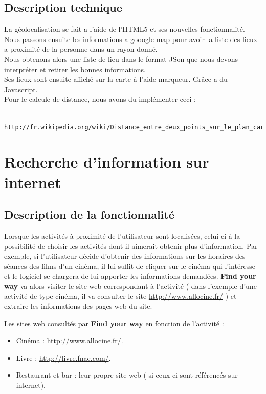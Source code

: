 \documentclass[10pt,a4paper]{report}
\begin{document}
\subsection{Description technique}
\begin{flushleft}
La géolocalisation se fait a l'aide de l'HTML5 et ses nouvelles fonctionnalité. Nous passons ensuite les informations a gooogle map pour avoir la liste des lieux a proximité de la personne dans un rayon donné. \\
Nous obtenons alors une liste de lieu dans le format JSon que nous devons interpréter et retirer les bonnes informations.\\
Ses lieux sont ensuite affiché sur la carte à l'aide marqueur. Grâce a du Javascript. \\

Pour le calcule de distance, nous avons du implémenter ceci : 
\begin{verbatim}
	http://fr.wikipedia.org/wiki/Distance_entre_deux_points_sur_le_plan_cart%C3%A9sien$ 
\end{verbatim}
\end{flushleft}



\section{Recherche d'information sur internet}

\subsection{Description de la fonctionnalité}
\begin{flushleft}
Lorsque les activités à proximité de l'utilisateur sont localisées, celui-ci à la possibilité de choisir les activités dont il aimerait obtenir plus d'information.
Par exemple, si l'utilisateur décide d'obtenir des informations sur les horaires des séances des films d'un cinéma, il lui suffit de cliquer sur le cinéma qui l’intéresse et le logiciel se chargera de lui apporter les informations demandées.
\textbf{Find your way} va alors visiter le site web correspondant à l'activité ( dans l'exemple d'une activité de type cinéma, il va consulter le site \url{http://www.allocine.fr/} ) et extraire les informations des pages web du site.\linebreak

Les sites web consultés par \textbf{Find your way} en fonction de l'activité :

\begin{itemize}
\item Cinéma : \url{http://www.allocine.fr/}.

\item Livre : \url{http://livre.fnac.com/}.

\item Restaurant et bar : leur propre site web ( si ceux-ci sont référencés sur internet).

\end{itemize}
\end{flushleft}
\end{document}
